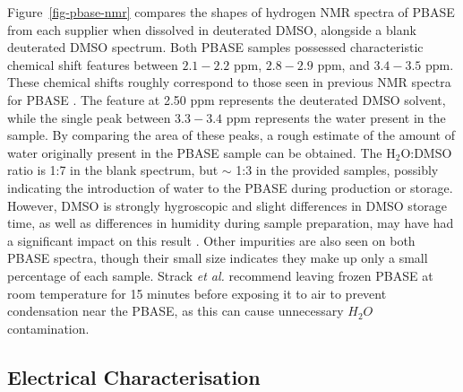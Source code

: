 \documentclass[
  a4paper,
]{scrbook}
\begin{document}
Figure~\ref{fig-pbase-nmr} compares the shapes of hydrogen NMR spectra
of PBASE from each supplier when dissolved in deuterated DMSO, alongside
a blank deuterated DMSO spectrum. Both PBASE samples possessed
characteristic chemical shift features between \(2.1-2.2\) ppm,
\(2.8-2.9\) ppm, and \(3.4-3.5\) ppm. These chemical shifts roughly
correspond to those seen in previous NMR spectra for PBASE
\autocite{NMR2}. The feature at 2.50 ppm represents the deuterated DMSO
solvent, while the single peak between \(3.3-3.4\) ppm represents the
water present in the sample. By comparing the area of these peaks, a
rough estimate of the amount of water originally present in the PBASE
sample can be obtained. The H\(_{2}\)O:DMSO ratio is 1:7 in the blank
spectrum, but \(\sim\) 1:3 in the provided samples, possibly indicating
the introduction of water to the PBASE during production or storage.
However, DMSO is strongly hygroscopic and slight differences in DMSO
storage time, as well as differences in humidity during sample
preparation, may have had a significant impact on this result
\autocite{Lebel1962}. Other impurities are also seen on both PBASE
spectra, though their small size indicates they make up only a small
percentage of each sample. Strack \emph{et al.} \autocite{Strack2013}
recommend leaving frozen PBASE at room temperature for 15 minutes before
exposing it to air to prevent condensation near the PBASE, as this can
cause unnecessary \(H_2O\) contamination.

\hypertarget{electrical-characterisation}{%
\subsection{Electrical
Characterisation}\label{electrical-characterisation}}
\end{document}

